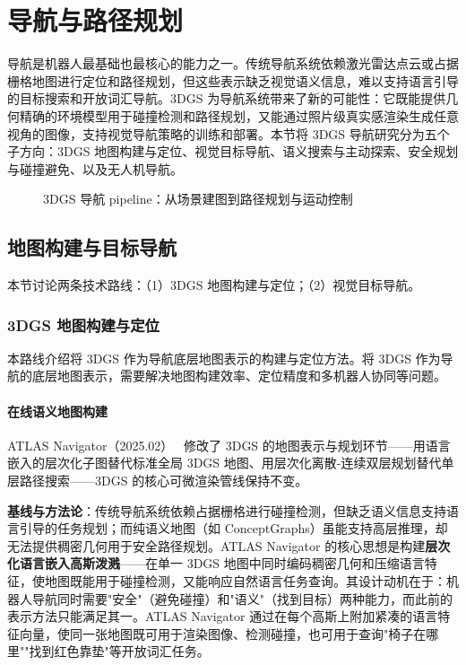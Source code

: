\section{导航与路径规划}
\label{sec:17_1}

导航是机器人最基础也最核心的能力之一。传统导航系统依赖激光雷达点云或占据栅格地图进行定位和路径规划，但这些表示缺乏视觉语义信息，难以支持语言引导的目标搜索和开放词汇导航。3DGS 为导航系统带来了新的可能性：它既能提供几何精确的环境模型用于碰撞检测和路径规划，又能通过照片级真实感渲染生成任意视角的图像，支持视觉导航策略的训练和部署。本节将 3DGS 导航研究分为五个子方向：3DGS 地图构建与定位、视觉目标导航、语义搜索与主动探索、安全规划与碰撞避免、以及无人机导航。

\begin{figure}[htbp]
\centering
\resizebox{\textwidth}{!}{}
\caption{3DGS 导航 pipeline：从场景建图到路径规划与运动控制}
\label{fig:ch17_nav_pipeline}
\end{figure}

\subsection{地图构建与目标导航}
\label{ss:17_1a}

本节讨论两条技术路线：（1）3DGS 地图构建与定位；（2）视觉目标导航。

\subsubsection{3DGS 地图构建与定位}

本路线介绍将 3DGS 作为导航底层地图表示的构建与定位方法。将 3DGS 作为导航的底层地图表示，需要解决地图构建效率、定位精度和多机器人协同等问题。

\paragraph{在线语义地图构建}

ATLAS Navigator（2025.02）~\cite{2502_20386} 修改了 3DGS 的地图表示与规划环节——用语言嵌入的层次化子图替代标准全局 3DGS 地图、用层次化离散-连续双层规划替代单层路径搜索——3DGS 的核心可微渲染管线保持不变。

\textbf{基线与方法论}：传统导航系统依赖占据栅格进行碰撞检测，但缺乏语义信息支持语言引导的任务规划；而纯语义地图（如 ConceptGraphs）虽能支持高层推理，却无法提供稠密几何用于安全路径规划。ATLAS Navigator 的核心思想是构建\textbf{层次化语言嵌入高斯泼溅}——在单一 3DGS 地图中同时编码稠密几何和压缩语言特征，使地图既能用于碰撞检测，又能响应自然语言任务查询。其设计动机在于：机器人导航同时需要"安全"（避免碰撞）和"语义"（找到目标）两种能力，而此前的表示方法只能满足其一。ATLAS Navigator 通过在每个高斯上附加紧凑的语言特征向量，使同一张地图既可用于渲染图像、检测碰撞，也可用于查询"椅子在哪里""找到红色靠垫"等开放词汇任务。

